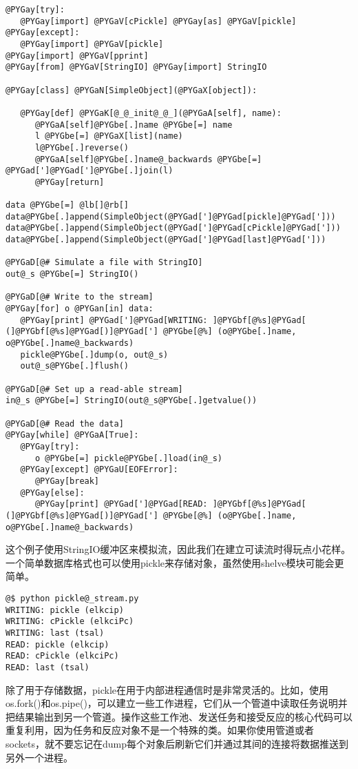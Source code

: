 \documentclass[a4paper,10pt,english]{manual}
\begin{document}
\begin{Verbatim}[commandchars=@\[\]]
@PYGay[try]:
   @PYGay[import] @PYGaV[cPickle] @PYGay[as] @PYGaV[pickle]
@PYGay[except]:
   @PYGay[import] @PYGaV[pickle]
@PYGay[import] @PYGaV[pprint]
@PYGay[from] @PYGaV[StringIO] @PYGay[import] StringIO

@PYGay[class] @PYGaN[SimpleObject](@PYGaX[object]):

   @PYGay[def] @PYGaK[@_@_init@_@_](@PYGaA[self], name):
      @PYGaA[self]@PYGbe[.]name @PYGbe[=] name
      l @PYGbe[=] @PYGaX[list](name)
      l@PYGbe[.]reverse()
      @PYGaA[self]@PYGbe[.]name@_backwards @PYGbe[=] @PYGad[']@PYGad[']@PYGbe[.]join(l)
      @PYGay[return]

data @PYGbe[=] @lb[]@rb[]
data@PYGbe[.]append(SimpleObject(@PYGad[']@PYGad[pickle]@PYGad[']))
data@PYGbe[.]append(SimpleObject(@PYGad[']@PYGad[cPickle]@PYGad[']))
data@PYGbe[.]append(SimpleObject(@PYGad[']@PYGad[last]@PYGad[']))

@PYGaD[@# Simulate a file with StringIO]
out@_s @PYGbe[=] StringIO()

@PYGaD[@# Write to the stream]
@PYGay[for] o @PYGan[in] data:
   @PYGay[print] @PYGad[']@PYGad[WRITING: ]@PYGbf[@%s]@PYGad[ (]@PYGbf[@%s]@PYGad[)]@PYGad['] @PYGbe[@%] (o@PYGbe[.]name, o@PYGbe[.]name@_backwards)
   pickle@PYGbe[.]dump(o, out@_s)
   out@_s@PYGbe[.]flush()

@PYGaD[@# Set up a read-able stream]
in@_s @PYGbe[=] StringIO(out@_s@PYGbe[.]getvalue())

@PYGaD[@# Read the data]
@PYGay[while] @PYGaA[True]:
   @PYGay[try]:
      o @PYGbe[=] pickle@PYGbe[.]load(in@_s)
   @PYGay[except] @PYGaU[EOFError]:
      @PYGay[break]
   @PYGay[else]:
      @PYGay[print] @PYGad[']@PYGad[READ: ]@PYGbf[@%s]@PYGad[ (]@PYGbf[@%s]@PYGad[)]@PYGad['] @PYGbe[@%] (o@PYGbe[.]name, o@PYGbe[.]name@_backwards)
\end{Verbatim}

这个例子使用StringIO缓冲区来模拟流，因此我们在建立可读流时得玩点小花样。一个简单数据库格式也可以使用pickle来存储对象，虽然使用shelve模块可能会更简单。

\begin{Verbatim}[commandchars=@\[\]]
@$ python pickle@_stream.py
WRITING: pickle (elkcip)
WRITING: cPickle (elkciPc)
WRITING: last (tsal)
READ: pickle (elkcip)
READ: cPickle (elkciPc)
READ: last (tsal)
\end{Verbatim}

除了用于存储数据，pickle在用于内部进程通信时是非常灵活的。比如，使用os.fork()和os.pipe()，可以建立一些工作进程，它们从一个管道中读取任务说明并把结果输出到另一个管道。操作这些工作池、发送任务和接受反应的核心代码可以重复利用，因为任务和反应对象不是一个特殊的类。如果你使用管道或者sockets，就不要忘记在dump每个对象后刷新它们并通过其间的连接将数据推送到另外一个进程。
\end{document}
